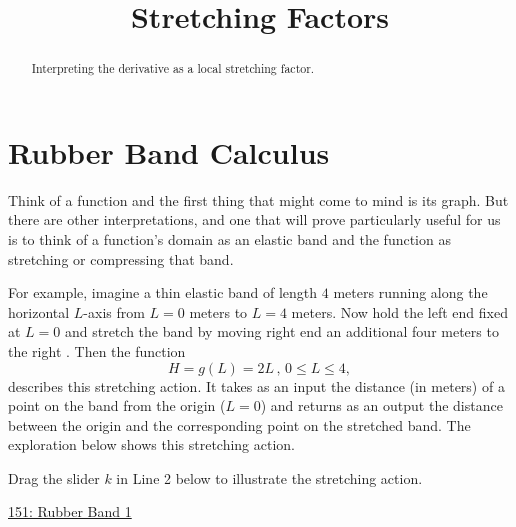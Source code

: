 \documentclass{ximera}
\title{Stretching Factors}
\begin{document}
\begin{abstract}
Interpreting the derivative as a local stretching factor.
\end{abstract}
\maketitle

\section{Rubber Band Calculus}

Think of a function and the first thing that might come to mind is its graph. But there are other interpretations, and one that will prove particularly useful for us is to think of a function's domain as an elastic band and the function as stretching or compressing that band. %

For example, imagine a thin elastic band of length $4$ meters running along the horizontal $L$-axis from $L=0$ meters to $L=4$ meters.  Now hold the left end fixed at $L=0$ and stretch the band by moving right end an additional four meters to the right . Then the function
\[
      H = g(L) = 2L \, , \, 0\leq L \leq 4 ,
\]
describes this stretching action. It takes as an input the distance (in meters) of a point on the band from the origin ($L=0$) and returns as an output the distance between the origin and the corresponding point on the stretched band. The exploration below shows this stretching action.

\begin{exploration} \label{Ex:98f3rgafgbb}
Drag the slider $k$ in Line 2 below to illustrate the stretching action.

\begin{onlineOnly}
    \begin{center}
\end{center}
\end{onlineOnly}

\href{https://www.desmos.com/calculator/qejivz36ui}{151: Rubber Band 1}

\end{exploration}
\end{document}
